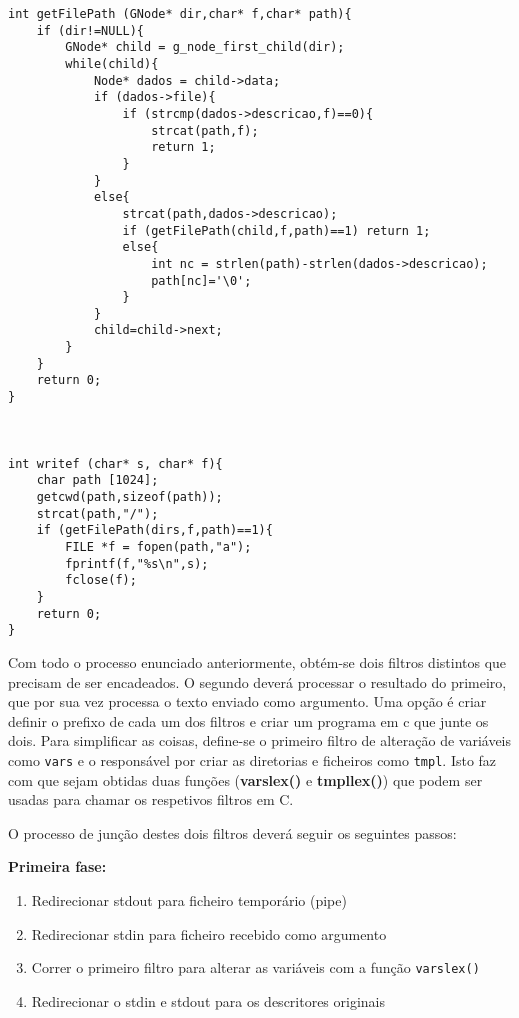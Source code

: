 \documentclass[12pt]{article}
\begin{document}
\begin{verbatim}
int getFilePath (GNode* dir,char* f,char* path){
    if (dir!=NULL){
        GNode* child = g_node_first_child(dir);
        while(child){
            Node* dados = child->data;
            if (dados->file){
                if (strcmp(dados->descricao,f)==0){
                    strcat(path,f);
                    return 1;
                }
            }
            else{
                strcat(path,dados->descricao);
                if (getFilePath(child,f,path)==1) return 1;
                else{
                    int nc = strlen(path)-strlen(dados->descricao);
                    path[nc]='\0';
                }
            }
            child=child->next;
        }
    }
    return 0;
}



int writef (char* s, char* f){
    char path [1024];
    getcwd(path,sizeof(path));
    strcat(path,"/");
    if (getFilePath(dirs,f,path)==1){
        FILE *f = fopen(path,"a");
        fprintf(f,"%s\n",s);
        fclose(f);
    }
    return 0;
}
\end{verbatim}

Com todo o processo enunciado anteriormente, obtém-se dois filtros distintos que precisam de ser encadeados. O segundo deverá processar o resultado do primeiro, que por sua vez processa o texto enviado como argumento.
Uma opção é criar definir o prefixo de cada um dos filtros e criar um programa em c que junte os dois.
Para simplificar as coisas, define-se o primeiro filtro de alteração de variáveis como \texttt{vars} e o responsável por criar as diretorias e ficheiros como \texttt{tmpl}. Isto faz com que sejam obtidas duas funções (\textbf{varslex()} e \textbf{tmpllex()}) que podem ser usadas para chamar os respetivos filtros em C.

O processo de junção destes dois filtros deverá seguir os seguintes passos:

\vspace{0.5cm}

\textbf{Primeira fase:}
\begin{enumerate}
    \item Redirecionar stdout para ficheiro temporário (pipe)
    \item Redirecionar stdin para ficheiro recebido como argumento
    \item Correr o primeiro filtro para alterar as variáveis com a função \texttt{varslex()}
    \item Redirecionar o stdin e stdout para os descritores originais
\end{enumerate}
\end{document}
